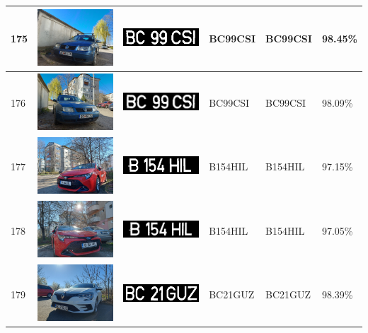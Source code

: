 \documentclass[a4paper,12pt]{report}
\begin{document}
\begin{longtable}{| m{0.6cm} | m{3cm} | m{3cm} | m{1.8cm} | m{1.8cm} | m{1.8cm} |}
        175 & \includegraphics[width=3cm,keepaspectratio]{dataset/109_d1.jpg} & \includegraphics[width=3cm,keepaspectratio]{segmentari/175.jpg} & BC99CSI & BC99CSI & 98.45\% \\ \hline
        176 & \includegraphics[width=3cm,keepaspectratio]{dataset/109_s1.jpg} & \includegraphics[width=3cm,keepaspectratio]{segmentari/176.jpg} & BC99CSI & BC99CSI & 98.09\% \\ \hline
        177 & \includegraphics[width=3cm,keepaspectratio]{dataset/110_d1.jpg} & \includegraphics[width=3cm,keepaspectratio]{segmentari/177.jpg} & B154HIL & B154HIL & 97.15\% \\ \hline
        178 & \includegraphics[width=3cm,keepaspectratio]{dataset/110_s1.jpg} & \includegraphics[width=3cm,keepaspectratio]{segmentari/178.jpg} & B154HIL & B154HIL & 97.05\% \\ \hline
        179 & \includegraphics[width=3cm,keepaspectratio]{dataset/111_d1.jpg} & \includegraphics[width=3cm,keepaspectratio]{segmentari/179.jpg} & BC21GUZ & BC21GUZ & 98.39\% \\ \hline

\end{longtable}
\end{document}
